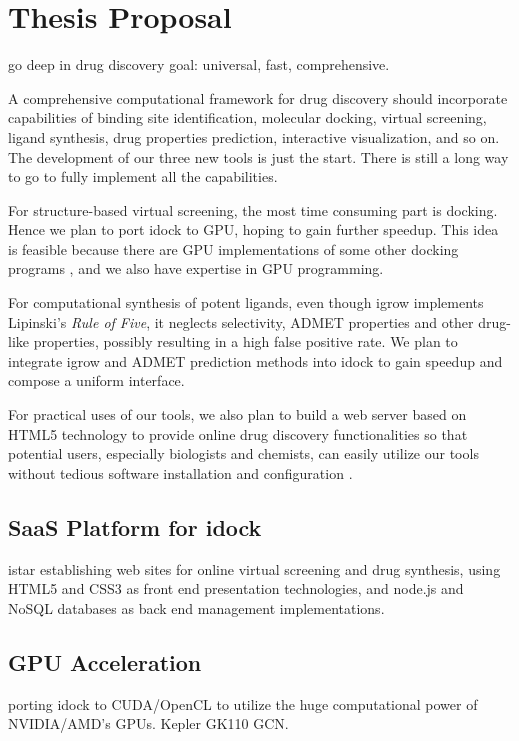 \chapter{Thesis Proposal}

go deep in drug discovery
goal: universal, fast, comprehensive.

A comprehensive computational framework for drug discovery should incorporate capabilities of binding site identification, molecular docking, virtual screening, ligand synthesis, drug properties prediction, interactive visualization, and so on. The development of our three new tools is just the start. There is still a long way to go to fully implement all the capabilities.

For structure-based virtual screening, the most time consuming part is docking. Hence we plan to port idock to GPU, hoping to gain further speedup. This idea is feasible because there are GPU implementations of some other docking programs \citep{723,652,779}, and we also have expertise in GPU programming.

For computational synthesis of potent ligands, even though igrow implements Lipinski's \textit{Rule of Five}, it neglects selectivity, ADMET properties and other drug-like properties, possibly resulting in a high false positive rate. We plan to integrate igrow and ADMET prediction methods into idock to gain speedup and compose a uniform interface.

For practical uses of our tools, we also plan to build a web server based on HTML5 technology to provide online drug discovery functionalities so that potential users, especially biologists and chemists, can easily utilize our tools without tedious software installation and configuration \citep{677}.

\section{SaaS Platform for idock}

istar establishing web sites for online virtual screening and drug synthesis, using HTML5 and CSS3 as front end presentation technologies, and node.js and NoSQL databases as back end management implementations.

\section{GPU Acceleration}

porting idock to CUDA/OpenCL to utilize the huge computational power of NVIDIA/AMD's GPUs.
Kepler GK110
GCN.

